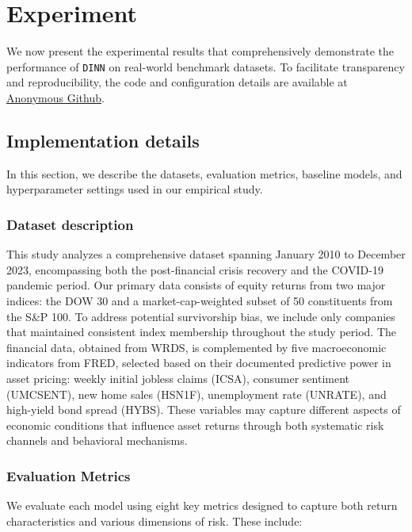 \section{Experiment}
We now present the experimental results that comprehensively demonstrate the performance of \texttt{DINN} on real-world benchmark datasets. To facilitate transparency and reproducibility, the code and configuration details are available at \href{https://anonymous.4open.science/r/Decision-informed-Neural-Networks-with-Large-Language-Model-Integration-for-Portfolio-Optimization-A441/README.md}{Anonymous Github}.

\subsection{Implementation details}
In this section, we describe the datasets, evaluation metrics, baseline models, and hyperparameter settings used in our empirical study. 

\subsubsection{Dataset description}
This study analyzes a comprehensive dataset spanning January 2010 to December 2023, encompassing both the post-financial crisis recovery and the COVID-19 pandemic period. Our primary data consists of equity returns from two major indices: the DOW 30 and a market-cap-weighted subset of 50 constituents from the S\&P 100. To address potential survivorship bias, we include only companies that maintained consistent index membership throughout the study period. The financial data, obtained from WRDS, is complemented by five macroeconomic indicators from FRED, selected based on their documented predictive power in asset pricing: weekly initial jobless claims (ICSA), consumer sentiment (UMCSENT), new home sales (HSN1F), unemployment rate (UNRATE), and high-yield bond spread (HYBS). These variables may capture different aspects of economic conditions that influence asset returns through both systematic risk channels and behavioral mechanisms.

\subsubsection{Evaluation Metrics}
We evaluate each model using eight key metrics designed to capture both return characteristics and various dimensions of risk. These include:

